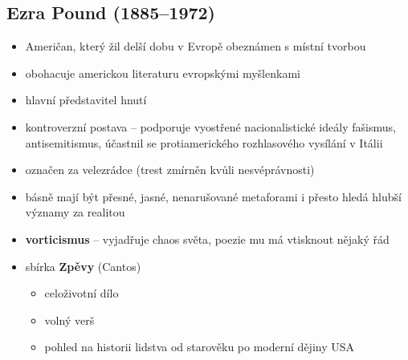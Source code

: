 \subsection{Ezra Pound (1885--1972)}
\begin{itemize}
\item Američan, který žil delší dobu v Evropě \ra obeznámen s místní tvorbou
\item obohacuje americkou literaturu evropskými myšlenkami
\item hlavní představitel hnutí
\item kontroverzní postava -- podporuje vyostřené nacionalistické ideály \ra fašismus, antisemitismus, účastnil se protiamerického rozhlasového vysílání v Itálii
\item označen za velezrádce (trest zmírněn kvůli nesvéprávnosti)
\item básně mají být přesné, jasné, nenarušované metaforami i přesto hledá hlubší významy za realitou
\item \textbf{vorticismus} -- vyjadřuje chaos světa, poezie mu má vtisknout nějaký řád
\item sbírka \textbf{Zpěvy} (Cantos)
	\begin{itemize}
	\item celoživotní dílo
	\item volný verš
	\item pohled na historii lidstva od starověku po moderní dějiny USA
	\end{itemize}
\end{itemize}

